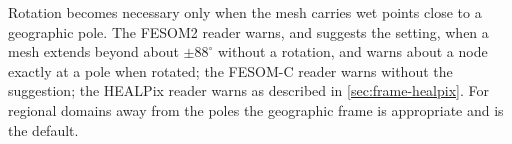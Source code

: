 Rotation becomes necessary only when the mesh carries wet points close to a geographic pole. The
FESOM2 reader warns, and suggests the  setting, when a mesh extends beyond about
$\pm 88^{\circ}$ without a rotation, and warns about a node exactly at a pole when rotated; the FESOM-C
reader warns without the suggestion; the HEALPix reader warns as described in \cref{sec:frame-healpix}.
For regional domains away from the poles the geographic frame is appropriate and is the default.

